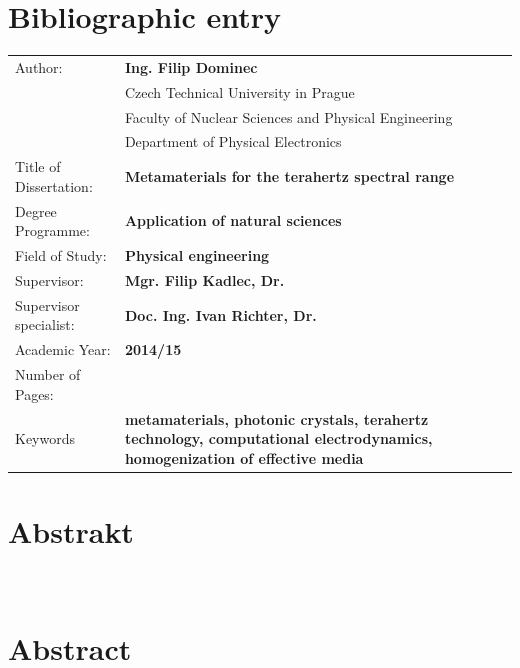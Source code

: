 \chapter*{Bibliographic entry}
\bgroup {}
\noindent\begin{tabular}{p{.25\linewidth}p{.7\linewidth}}
Author:					&\textbf{Ing. Filip Dominec} \\
					~	&Czech Technical University in Prague\\
					~	&Faculty of Nuclear Sciences and Physical Engineering\\ 
					~	&Department of Physical Electronics\\
Title of Dissertation:	&\textbf{Metamaterials for the terahertz spectral range} \\
Degree Programme:		&\textbf{Application of natural sciences} \\
Field of Study:			&\textbf{Physical engineering} \\
Supervisor:				&\textbf{Mgr. Filip Kadlec, Dr.} \\
Supervisor specialist:	&\textbf{Doc. Ing. Ivan Richter, Dr.} \\
Academic Year:			&\textbf{2014/15} \\
Number of Pages:		&\textbf{\pageref{enddocument}} \\
Keywords				&\textbf{metamaterials, photonic crystals, terahertz technology, computational electrodynamics, homogenization of effective media} \\
\end{tabular}
\egroup
\thispagestyle{empty} \newpage


\chapter*{Abstrakt}
\noindent ~

\vspace{10mm}
{\let\clearpage\relax\chapter*{Abstract}}
\noindent
~
\todo{+} 

